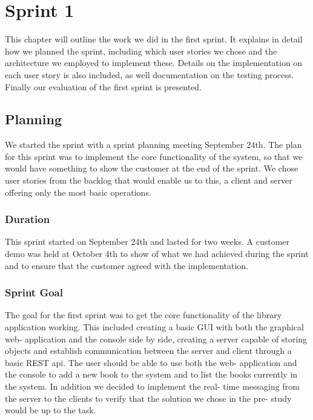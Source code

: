 \chapter{Sprint 1}

\minitoc

This chapter will outline the work we did in the first sprint. It explains in detail how we planned the sprint, including which user stories we chose and the architecture we employed to implement these. Details on the implementation on each user story is also included, as well documentation on the testing process. Finally our evaluation of the first sprint is presented. 

\clearpage

\section{Planning}
We started the sprint with a sprint planning meeting September 24th. The plan for this sprint was to implement the core functionality of the system, so that we would have something to show the customer at the end of the sprint. We chose user stories from the backlog that would enable us to this, a client and server offering only the most basic operations. 

\subsection{Duration}
This sprint started on September 24th and lasted for two weeks. A customer demo was held at October 4th to show of what we had achieved during the sprint and to ensure that the customer agreed with the implementation.

\subsection{Sprint Goal}
The goal for the first sprint was to get the core functionality of the library application working. This included creating a basic GUI with both the graphical web- application and the console side by side, creating a server capable of storing objects and establish communication between the server and client through a basic REST api. The user should be able to use both the web- application and the console to add a new book to the system and to list the books currently in the system. In addition we decided to implement the real- time messaging from the server to the clients to verify that the solution we chose in the pre- study would be up to the task.

